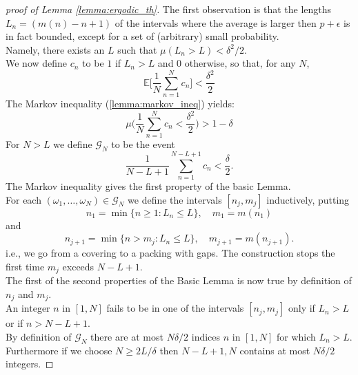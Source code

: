 \begin{proof}[proof of Lemma \ref{lemma:ergodic_th}]
    The first observation is that the lengths $L_n = ( m(n) -n +1 )$ of the intervals where the average is larger then $p + \epsilon$ is in fact bounded, except for a set of (arbitrary) small probability.
    \\Namely, there exists an $L$ such that $\mu(L_n > L) < \delta^2/2$.
    \\We now define $c_n$ to be $1$ if $L_n>L$ and $0$ otherwise, so that, for any $N$,
    \begin{equation*}
        \mathbb{E} \bigg[ \frac{1}{N} \sum_{n=1}^N c_n \bigg] < \frac{\delta^2}{2}
    \end{equation*}
    The Markov inequality (\ref{lemma:markov_ineq}) yields:
    \begin{equation*}
        \mu \bigg( \frac{1}{N} \sum_{n=1}^N c_n < \frac{\delta^2}{2} \bigg) > 1 - \delta
    \end{equation*}
    For $N>L$ we define $\mathcal{G}_N$ to be the event
    \begin{equation*}
        \frac{1}{N-L+1} \sum_{n=1}^{N-L+1} c_n < \frac{\delta}{2}.
    \end{equation*}
    The Markov inequality gives the first property of the basic Lemma.
    \\For each $(\omega_1, \dots, \omega_N) \in \mathcal{G}_N$ we define the intervals $[n_j, m_j]$ inductively, putting 
    \begin{equation*}
        n_1 = \min \{ n \geq 1: L_n \leq L \}, \quad m_1 = m(n_1)
    \end{equation*}
    and 
    \begin{equation*}
        n_{j+1} = \min \{ n > m_j : L_n \leq L \}, \quad m_{j+1} = m(n_{j+1}).
    \end{equation*}
    i.e.,  we go from a covering to a packing with gaps. The construction stops the first time $m_j$ exceeds $N-L+1$.
    \\The first of the second properties of the Basic Lemma is now true by definition of $n_j$ and $m_j$.
    \\An integer $n$ in $[1,N]$  fails to be in one of the intervals $[n_j, m_j]$ only if $L_n > L$ or if $n > N - L + 1$.
    \\By definition of $\mathcal{G}_N$ there are at most $N\delta/2$ indices $n$ in $[1,N]$ for which $L_n > L$.
    \\Furthermore if we choose $N \geq 2L/\delta$ then $N-L+1, N$ contains at most $N\delta/2$ integers.
\end{proof}

